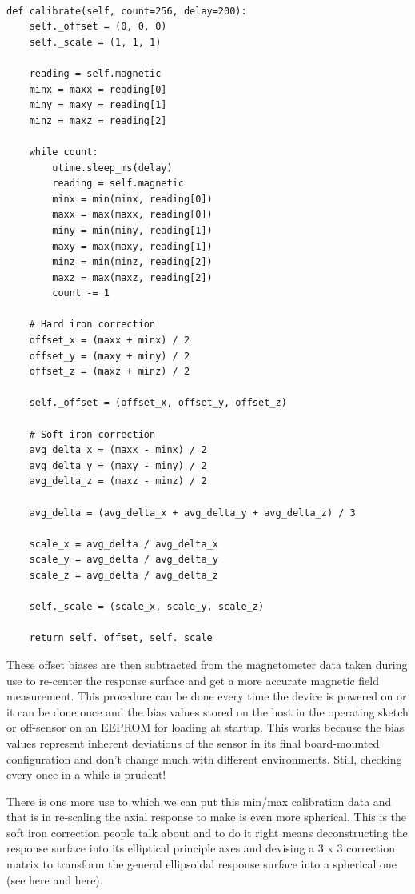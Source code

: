 \lstset{language=Python}
\begin{lstlisting}[frame=single]  % Start your code-block

def calibrate(self, count=256, delay=200):
    self._offset = (0, 0, 0)
    self._scale = (1, 1, 1)

    reading = self.magnetic
    minx = maxx = reading[0]
    miny = maxy = reading[1]
    minz = maxz = reading[2]

    while count:
        utime.sleep_ms(delay)
        reading = self.magnetic
        minx = min(minx, reading[0])
        maxx = max(maxx, reading[0])
        miny = min(miny, reading[1])
        maxy = max(maxy, reading[1])
        minz = min(minz, reading[2])
        maxz = max(maxz, reading[2])
        count -= 1

    # Hard iron correction
    offset_x = (maxx + minx) / 2
    offset_y = (maxy + miny) / 2
    offset_z = (maxz + minz) / 2

    self._offset = (offset_x, offset_y, offset_z)

    # Soft iron correction
    avg_delta_x = (maxx - minx) / 2
    avg_delta_y = (maxy - miny) / 2
    avg_delta_z = (maxz - minz) / 2

    avg_delta = (avg_delta_x + avg_delta_y + avg_delta_z) / 3

    scale_x = avg_delta / avg_delta_x
    scale_y = avg_delta / avg_delta_y
    scale_z = avg_delta / avg_delta_z

    self._scale = (scale_x, scale_y, scale_z)

    return self._offset, self._scale

\end{lstlisting}



These offset biases are then subtracted from the magnetometer data taken during use to re-center the response surface and get a more accurate magnetic field measurement. This procedure can be done every time the device is powered on or it can be done once and the bias values stored on the host in the operating sketch or off-sensor on an EEPROM for loading at startup. This works because the bias values represent inherent deviations of the sensor in its final board-mounted configuration and don't change much with different environments. Still, checking every once in a while is prudent!

There is one more use to which we can put this min/max calibration data and that is in re-scaling the axial response to make is even more spherical. This is the soft iron correction people talk about and to do it right means deconstructing the response surface into its elliptical principle axes and devising a 3 x 3 correction matrix to transform the general ellipsoidal response surface into a spherical one (see here and here).

